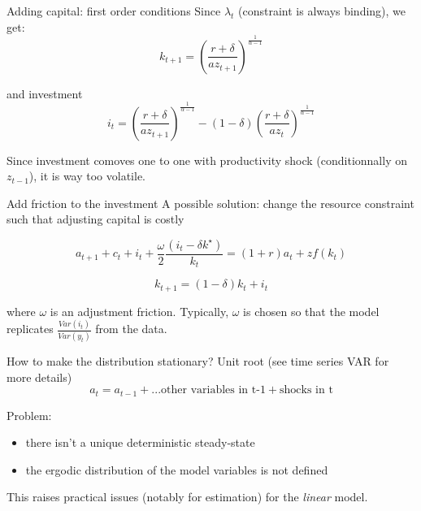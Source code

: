 \documentclass[
  ignorenonframetext,
]{beamer}
\providecommand{\tightlist}{%
  \setlength{\itemsep}{0pt}\setlength{\parskip}{0pt}}\usepackage{longtable,booktabs,array}
\begin{document}
\begin{frame}{Adding capital: first order conditions}
\label{adding-capital-first-order-conditions}
Since \(\lambda_t\) (constraint is always binding), we get:
\[k_{t+1} = \left( \frac{r+\delta}{a z_{t+1}}\right)^{\frac{1}{\alpha-1}}\]

and investment
\[i_t = \left( \frac{r+\delta}{a z_{t+1}}\right)^{\frac{1}{\alpha-1}}- (1-\delta)\left( \frac{r+\delta}{a z_{t}}\right)^{\frac{1}{\alpha-1}}\]

Since investment comoves one to one with productivity shock
(conditionnally on \(z_{t-1}\)), it is way too volatile.
\end{frame}

\begin{frame}{Add friction to the investment}
\label{add-friction-to-the-investment}
A possible solution: change the resource constraint such that adjusting
capital is costly

\[a_{t+1} + c_t + i_t + \frac{\omega}{2}\frac{(i_t-\delta k^{\star})}{k_t} = (1+r)a_t + z f(k_t)\]

\[k_{t+1} = (1-\delta) k_t + i_t\]

where \(\omega\) is an adjustment friction. Typically, \(\omega\) is
chosen so that the model replicates \(\frac{Var(i_t)}{Var(y_t)}\) from
the data.
\end{frame}

\begin{frame}{How to make the distribution stationary?}
\label{how-to-make-the-distribution-stationary}
Unit root (see time series VAR for more details)
\[a_t = a_{t-1} + ... \text{other variables in t-1} + \text{shocks in t}\]

Problem:

\begin{itemize}
\tightlist
\item
  there isn't a unique deterministic steady-state
\item
  the ergodic distribution of the model variables is not defined
\end{itemize}

This raises practical issues (notably for estimation) for the
\emph{linear} model.
\end{frame}
\end{document}
